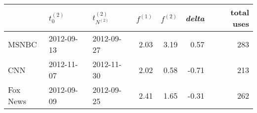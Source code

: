 \begin{tabular}{lllrrrr}
\toprule
{} & $t_0^{(2)}$ & $t^{(2)}_{N^{(2)}}$ & $f^{(1)}$ & $f^{(2)}$ & \emph{delta} & total uses \\
\midrule
MSNBC    &  2012-09-13 &          2012-09-27 &      2.03 &      3.19 &       0.57 &        283 \\
CNN      &  2012-11-07 &          2012-11-30 &      2.02 &      0.58 &      -0.71 &        213 \\
Fox News &  2012-09-09 &          2012-09-25 &      2.41 &      1.65 &      -0.31 &        262 \\
\bottomrule
\end{tabular}
